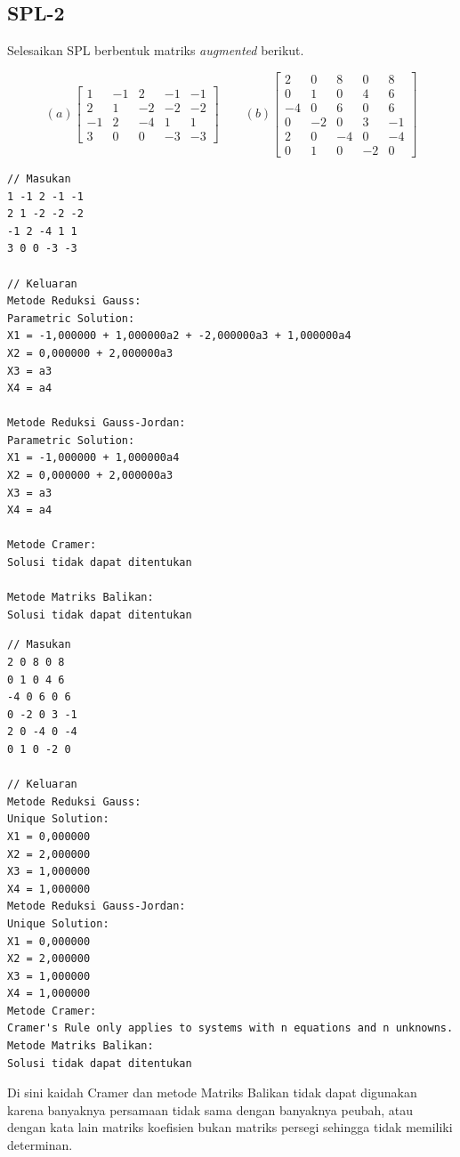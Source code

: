\pagebreak
\subsection{SPL-2}
Selesaikan SPL berbentuk matriks \textit{augmented} berikut.

\[(a) \begin{bmatrix}
1 & -1 & 2 & -1 & -1\\
2 & 1 & -2 & -2 & -2\\
-1 & 2 & -4 & 1 & 1 \\
3 & 0 & 0 & -3 & -3 
\end{bmatrix} \qquad (b)
\begin{bmatrix}
2   & 0  & 8  & 0  & 8  \\
0   & 1  & 0  & 4  & 6  \\
-4  & 0  & 6  & 0  & 6  \\
0   & -2 & 0  & 3  & -1 \\
2   & 0  & -4 & 0  & -4 \\
0   & 1  & 0  & -2 & 0
\end{bmatrix}\]

\begin{lstlisting}[caption = spl-2a.txt]
// Masukan
1 -1 2 -1 -1
2 1 -2 -2 -2
-1 2 -4 1 1
3 0 0 -3 -3

// Keluaran
Metode Reduksi Gauss:
Parametric Solution:
X1 = -1,000000 + 1,000000a2 + -2,000000a3 + 1,000000a4
X2 = 0,000000 + 2,000000a3
X3 = a3
X4 = a4

Metode Reduksi Gauss-Jordan:
Parametric Solution:
X1 = -1,000000 + 1,000000a4
X2 = 0,000000 + 2,000000a3
X3 = a3
X4 = a4

Metode Cramer:
Solusi tidak dapat ditentukan

Metode Matriks Balikan:
Solusi tidak dapat ditentukan\end{lstlisting}

\begin{lstlisting}[caption = spl-2b.txt]
// Masukan
2 0 8 0 8
0 1 0 4 6
-4 0 6 0 6
0 -2 0 3 -1
2 0 -4 0 -4
0 1 0 -2 0

// Keluaran
Metode Reduksi Gauss:
Unique Solution:
X1 = 0,000000
X2 = 2,000000
X3 = 1,000000
X4 = 1,000000
Metode Reduksi Gauss-Jordan:
Unique Solution:
X1 = 0,000000
X2 = 2,000000
X3 = 1,000000
X4 = 1,000000
Metode Cramer:
Cramer's Rule only applies to systems with n equations and n unknowns.
Metode Matriks Balikan:
Solusi tidak dapat ditentukan\end{lstlisting}

Di sini kaidah Cramer dan metode Matriks Balikan tidak dapat digunakan karena banyaknya persamaan tidak sama dengan banyaknya peubah, atau dengan kata lain matriks koefisien bukan matriks persegi sehingga tidak memiliki determinan.

